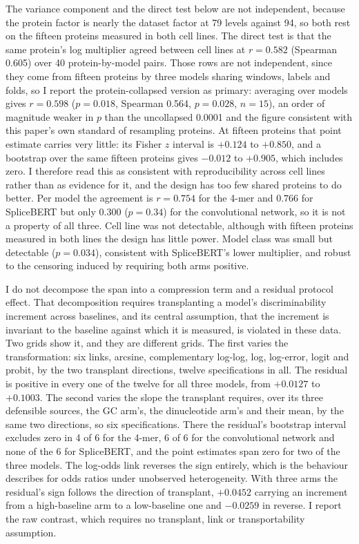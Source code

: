 The variance component and the direct test below are not independent, because the
protein factor is nearly the dataset factor at 79 levels against 94, so both rest on the fifteen
proteins measured in both cell lines. The direct test is that the same protein's log multiplier
agreed between cell lines at $r=0.582$ (Spearman 0.605) over 40 protein-by-model pairs. Those
rows are not independent, since they come from fifteen proteins by three models sharing windows,
labels and folds, so I report the protein-collapsed version as primary: averaging over models
gives $r=0.598$ ($p=0.018$, Spearman 0.564, $p=0.028$, $n=15$), an order of magnitude weaker in
$p$ than the uncollapsed 0.0001 and the figure consistent with this paper's own standard of
resampling proteins. At fifteen proteins that point estimate carries very little: its Fisher $z$
interval is $+0.124$ to $+0.850$, and a bootstrap over the same fifteen proteins gives $-0.012$
to $+0.905$, which includes zero. I therefore read this as consistent with reproducibility
across cell lines rather than as evidence for it, and the design has too few shared proteins to
do better. Per model the agreement is $r=0.754$ for the 4-mer and $0.766$ for
SpliceBERT but only $0.300$ ($p=0.34$) for the convolutional network, so it is not a property of
all three. Cell line was not detectable, although with fifteen proteins measured in both lines
the design has little power. Model class was small but detectable ($p=0.034$), consistent with
SpliceBERT's lower multiplier, and robust to the censoring induced by requiring both arms
positive.

I do not decompose the span into a compression term and a residual protocol effect. That
decomposition requires transplanting a model's discriminability increment across baselines, and
its central assumption, that the increment is invariant to the baseline against which it is
measured, is violated in these data. Two grids show it, and they are different grids. The first varies
the transformation: six links, arcsine, complementary log-log, log, log-error, logit and probit,
by the two transplant directions, twelve specifications in all. The residual is positive in
every one of the twelve for all three models, from $+0.0127$ to $+0.1003$. The second varies
the slope the transplant requires, over its three defensible sources, the GC arm's, the
dinucleotide arm's and their mean, by the same two directions, so six specifications. There the
residual's bootstrap interval excludes zero in 4 of 6 for the 4-mer, 6 of 6 for the
convolutional network and none of the 6 for SpliceBERT, and the point estimates span zero for
two of the three models. The log-odds link reverses the sign entirely, which is the behaviour
\citet{mood2010} describes for odds ratios under unobserved heterogeneity. With three arms the residual's sign follows the direction
of transplant, $+0.0452$ carrying an increment from a high-baseline arm to a low-baseline one and
$-0.0259$ in reverse. I report the raw contrast, which requires no transplant, link or
transportability assumption.


